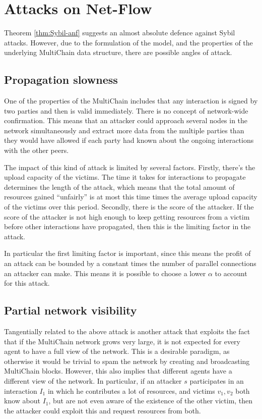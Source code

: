 \documentclass[a4paper,11pt]{book}
\theoremstyle{definition}
\begin{document}
\section{Attacks on Net-Flow}
\label{sec:att_netflow}

Theorem \ref{thm:Sybil-anf} suggests an almost absolute defence against Sybil attacks. However,
due to the formulation of the model, and the properties of the underlying MultiChain data structure,
there are possible angles of attack.

\subsection{Propagation slowness}

One of the properties of the MultiChain includes that any interaction is signed by two parties and
then is valid immediately. There is no concept of network-wide confirmation. This means that an attacker
could approach several nodes in the network simultaneously and extract more data from the multiple parties
than they would have allowed if each party had known about the ongoing interactions with the other peers.

The impact of this kind of attack is limited by several factors. Firstly, there's the upload capacity of the
victims. The time it takes for interactions to propagate determines the length of the attack, which means that
the total amount of resources gained ``unfairly'' is at most this time times the average upload capacity of
the victims over this period. Secondly, there is the score of the attacker. If the score of the attacker is
not high enough to keep getting resources from a victim before other interactions have propagated, then this
is the limiting factor in the attack. 

In particular the first limiting factor is important, since this means the profit of an attack can be bounded
by a constant times the number of parallel connections an attacker can make. This means it is possible
to choose a lower $\alpha$ to account for this attack. 

\subsection{Partial network visibility}

Tangentially related to the above attack is another attack that exploits the fact that if the MultiChain
network grows very large, it is not expected for every agent to have a full view of the network. This
is a desirable paradigm, as otherwise it would be trivial to spam the network by creating and broadcasting
MultiChain blocks. However, this also implies that different agents have a different view of the network.
In particular, if an attacker $s$ participates in an interaction $I_1$ in which he contributes a lot
of resources, and victims $v_1, v_2$ both know about $I_1$, but are not even aware of the existence of
the other victim, then the attacker could exploit this and request resources from both. 
\end{document}
